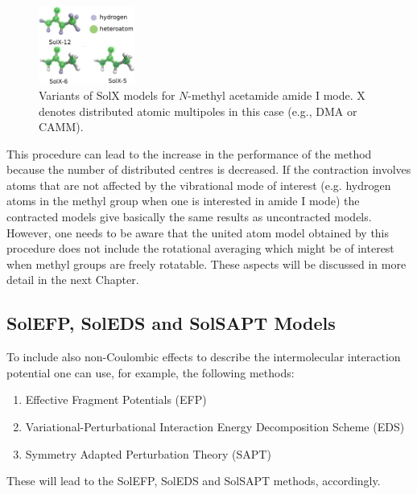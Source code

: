 \documentclass[b5paper,oneside,fleqn,11pt]{book}
\begin{document}
\begin{refsection}
\begin{figure}[b!]
\begin{center}
    \includegraphics[width=0.28\textwidth]{SolXn.eps}
  \end{center}
  \caption{Variants of SolX models for $N$-methyl acetamide amide I mode.
X denotes distributed atomic multipoles in this case (e.g., DMA or CAMM).\label{f:solxn}}
\end{figure}
%
\noindent This procedure can lead to the increase in the performance
of the method because the number of distributed centres
is decreased. If the contraction involves atoms that 
are not affected by the vibrational mode of interest (e.g. 
hydrogen atoms in the methyl group when one is interested
in amide I mode) the contracted models give basically 
the same results as uncontracted models. However, one needs to 
be aware that the united atom model obtained by this procedure
does not include the rotational averaging which might be of
interest when methyl groups are freely rotatable. These aspects 
will be discussed in more detail in the next Chapter. 

\subsection{SolEFP, SolEDS and SolSAPT Models\label{s:solefp-soleds-solsapt}}

To include also non\hyp{}Coulombic effects to describe 
the intermolecular interaction potential one can use, for example,
the following methods:
%
\begin{enumerate}
  \item Effective Fragment 
Potentials \citep{Day.Jensen.Gordon.Webb.Stevens.Krauss.Garmer.Basch.Cohen.JCP.1996,
Flick.Kosenkov.Hohenstein.Sherrill.Slipchenko.JCTC.2012} (EFP)
  \item Variational\hyp{}Perturbational Interaction Energy Decomposition
Scheme \citep{Sokalski.Roszak.Pecul.CPL.1988,
Chalasinski.Szczesniak.MolPhys.1988,Cybulski.Chalasinski.Moszynski.JCP.1990,
Gora.Bartkowiak.Roszak.Leszczynski.JCP.2004} (EDS)
  \item Symmetry Adapted Perturbation Theory \citep{Jeziorski.Moszynski.Szalewicz.ChemRev.1994} (SAPT)
\end{enumerate}
%
These will lead to the SolEFP, SolEDS and SolSAPT methods, accordingly. 


\end{refsection}
\end{document}
